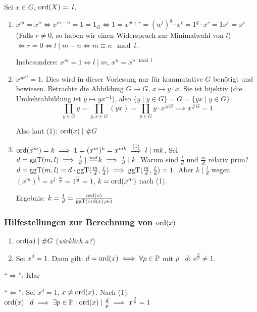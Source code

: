 \documentclass[a4paper,DIV15,BCOR12mm]{article}
\begin{document}
\begin{beweis}[Elementordnungssatz]
Sei $x\in G$, $\mathop{\rm ord}\nolimits(X) =: l$.
\begin{enumerate}
\item $x^m = x^n \iff x^{m-n}= 1 = 1_G \iff 1= x^{ql+r} = (w^l)^q\cdot x^r = 1^q\cdot x^r = 1x^r = x^r$ (Falls $r\ne0$, so haben wir einen Widerspruch zur Minimalwahl von $l$) $\iff r=0 \iff l\mid m-n \iff m \equiv n \mod l$.

Insbesondere: $x^m=1 \iff l \mid m$, $x^n = x^{n\mod l}$
\item $x^{\#G} = 1$. Dies wird in dieser Vorlesung nur für kommutative $G$ benötigt und bewiesen. Betrachte die Abbildung $G\to G$, $x \mapsto y\cdot x$. Sie ist bijektiv (die Umkehrabbildung ist $y\mapsto y x^{-1}$), also $\{y \mid y\in G\} = G = \{yx \mid y\in G\}$.
\[ \prod_{y\in G}y  =\prod_{y,x\in G} (yx) = \prod_{y\in G} y \cdot x^{\#G} \implies x^{\#G} = 1 \]

Also laut (1): $\mathop{\rm ord}\nolimits(x) \mid \#G$

\item $\ord(x^m)=k \implies 1= (x^m)^k = x^{mk} \folgtnach{(1)} l \mid mk$. Sei $d=\mathop{\rm ggT}\nolimits(m,l) \implies \frac{l}{d} \mid \frac{m d} \cdot k \implies \frac l d \mid k$. Warum sind $\frac l d$ und $\frac md$ relativ prim? $d = \mathop{\rm ggT}\nolimits(m,l)= d\cdot \mathop{\rm ggT}\nolimits(\frac m d, \frac l d) \implies \mathop{\rm ggT}\nolimits(\frac m d, \frac l d) = 1$. Aber $k \mid \frac l d$ wegen $(x^m)^{\frac l d} = x^{l\cdot \frac md} = 1^{\frac m d} = 1$, $k= \mathop{\rm ord}\nolimits(x^m)$ nach (1).

Ergebnis: $k = \frac l d = \frac {\mathop{\rm ord}\nolimits(x)} {\mathop{\rm ggT}\nolimits(\mathop{\rm ord}\nolimits(x),m)}$

\end{enumerate}
\end{beweis}

\subsubsection*{Hilfestellungen zur Berechnung von $\mathop{\rm ord}\nolimits(x)$}

\begin{bemerkungen}
\begin{enumerate}
\item $\mathop{\rm ord}\nolimits(a)\mid\#G$ (\emph{wirklich $a$?})
\item Sei $x^d=1$. Dann gilt: $d = \mathop{\rm ord}\nolimits(x) \iff \forall p\in\mathbb{P}$ mit $p\mid d$: $x^{\frac dp} \ne 1$.
\end{enumerate}
\end{bemerkungen}
\begin{beweis}
"`$\Longrightarrow$"': Klar

"`$\Longleftarrow$"': Sei $x^d=1$, $x \ne \mathop{\rm ord}\nolimits(x)$. Nach (1):
$\mathop{\rm ord}\nolimits(x)\mid d \implies \exists p\in\mathbb{P}: \mathop{\rm ord}\nolimits(x) \mid \frac dp
\implies x^{\frac d p } = 1$
\end{beweis}
\end{document}
